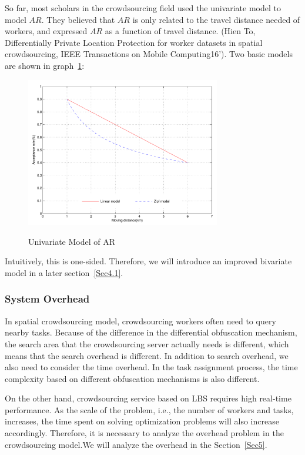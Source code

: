 So far, most scholars in the crowdsourcing field used the univariate model to model $AR$. They believed that $AR$ is only related to the travel distance needed of workers, and expressed $AR$ as a function of travel distance. (Hien To, Differentially Private Location Protection for worker datasets in spatial crowdsourcing, IEEE Transactions on Mobile Computing16'). Two basic models are shown in graph~\ref{img:UniModel}:

\begin{figure}
\includegraphics[width=8.5cm]{UniModel}
\label{img:UniModel}
\caption{Univariate Model of AR}
\end{figure}

Intuitively, this is one-sided. Therefore, we will introduce an improved bivariate model in a later section~\ref{Sec4.1}.

\subsubsection{System Overhead}
In spatial crowdsourcing model, crowdsourcing workers often need to query nearby tasks. Because of the difference in the differential obfuscation mechanism, the search area that the crowdsourcing server actually needs is different, which means that the search overhead is different. In addition to search overhead, we also need to consider the time overhead. In the task assignment process, the time complexity based on different obfuscation mechanisms is also different.

On the other hand, crowdsourcing service based on LBS requires high real-time performance. As the scale of the problem, i.e., the number of workers and tasks, increases, the time spent on solving optimization problems will also increase accordingly. Therefore, it is necessary to analyze the overhead problem in the crowdsourcing model.We will analyze the overhead in the Section~\ref{Sec5}.


